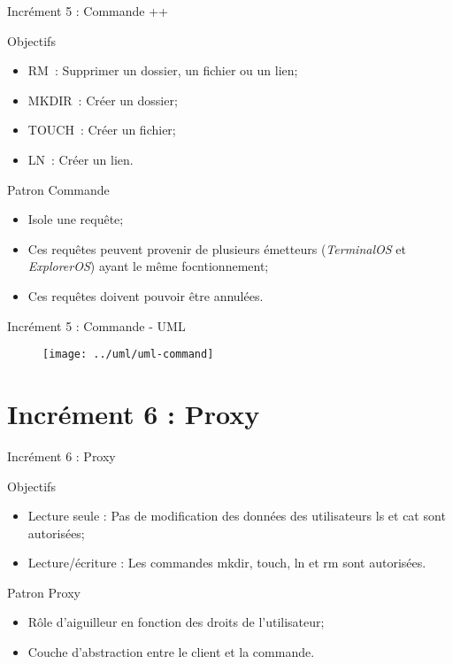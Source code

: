\documentclass[utf8, 14pt]{beamer}
\begin{document}
	\begin{frame}{Incrément 5 : Commande ++}
		\begin{block}{Objectifs}
		\begin{itemize}
		\item RM : Supprimer un dossier, un fichier ou un lien;
		\item MKDIR : Créer un dossier;
		\item TOUCH : Créer un fichier;
		\item LN : Créer un lien.
		\end{itemize}
		\end{block}
		
		\begin{exampleblock}{Patron Commande}
		\begin{itemize}
		\item Isole une requête;
		\item Ces requêtes peuvent provenir de plusieurs émetteurs (\emph{TerminalOS} et \emph{ExplorerOS}) ayant le même focntionnement;
		\item Ces requêtes doivent pouvoir être annulées.
		\end{itemize}
		\end{exampleblock}					
	\end{frame}

	\begin{frame}{Incrément 5 : Commande - UML}
		\begin{figure}[!h]
		\centering
		\texttt{[image: ../uml/uml-command]}
		\end{figure}		
	\end{frame}

\section{Incrément 6 : Proxy}
	
	\begin{frame}{Incrément 6 : Proxy}
		\begin{block}{Objectifs}
		\begin{itemize}
		\item Lecture seule : Pas de modification des données des utilisateurs ls et cat sont autorisées;
		\item Lecture/écriture : Les commandes mkdir, touch, ln et rm sont autorisées.
		\end{itemize}
		\end{block}
		
		\begin{exampleblock}{Patron Proxy}
		\begin{itemize}
		\item Rôle d'aiguilleur en fonction des droits de l'utilisateur;
		\item Couche d'abstraction entre le client et la commande.
		\end{itemize}
		\end{exampleblock}					
	\end{frame}
\end{document}
